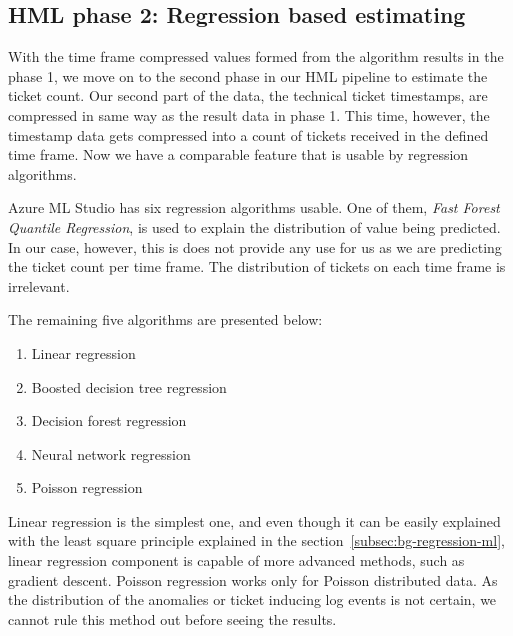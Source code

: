 

\subsection{HML phase 2: Regression based estimating}\label{subsec:pipe-regression-estimating}

With the time frame compressed values
formed from the algorithm results in the phase 1,
we move on to the second phase in our HML pipeline
to estimate the ticket count.
Our second part of the data,
the technical ticket timestamps,
are compressed in same way as the result data in phase 1.
This time, however,
the timestamp data gets compressed
into a count of tickets received in the defined time frame.
Now we have a comparable feature
that is usable by regression algorithms.

Azure ML Studio has six regression algorithms usable.
One of them,
\textit{Fast Forest Quantile Regression},
is used to explain the distribution of value being predicted.\cite{azure2021fastforestquantile}
In our case, however,
this is does not provide any use for us
as we are predicting the ticket count per time frame.
The distribution of tickets on each time frame is irrelevant.

The remaining five algorithms are presented below:
\begin{enumerate}
    \item Linear regression~\cite{azure2021linear}
    \item Boosted decision tree regression~\cite{azure2022boosteddecisiontree}
    \item Decision forest regression~\cite{azure2021decisionforest}
    \item Neural network regression~\cite{azure2021neuralnetwork}
    \item Poisson regression~\cite{azure2021poisson}
\end{enumerate}

Linear regression is the simplest one,
and even though it can be easily explained with the least square principle
explained in the section~\ref{subsec:bg-regression-ml},
linear regression component is capable of more advanced methods,
such as gradient descent.
Poisson regression works only for Poisson distributed data.
As the distribution of the anomalies or ticket inducing log events is not certain,
we cannot rule this method out before seeing the results.


